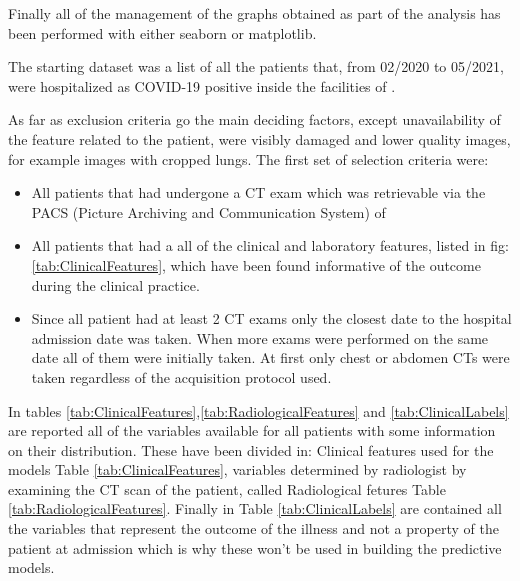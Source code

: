 Finally all of the management of the graphs obtained as part of the analysis has been performed with either seaborn\cite{seaborn} or matplotlib\cite{matplotlib}.


The starting dataset was a list of all the patients that, from 02/2020 to 05/2021, were hospitalized as COVID-19 positive inside the facilities of \orsola. 

As far as exclusion criteria go the main deciding factors, except unavailability of the feature related to the patient, were visibly damaged and lower quality images, for example images with cropped lungs. The first set of selection criteria were:

\begin{itemize}
\item All patients that had undergone a CT exam which was retrievable via the PACS (Picture Archiving and Communication System) of \orsola
\item All patients that had a all of the clinical and laboratory features, listed in fig:\ref{tab:ClinicalFeatures}, which have been found informative of the outcome during the clinical practice.
\item Since all patient had at least 2 CT exams only the closest date to the hospital admission date was taken. When more exams were performed on the same date all of them were initially taken. At first only chest or abdomen CTs were taken regardless of the acquisition protocol used.
\end{itemize}

In tables \ref{tab:ClinicalFeatures},\ref{tab:RadiologicalFeatures} and  \ref{tab:ClinicalLabels} are reported all of the variables available for all patients with some information on their distribution.
These have been divided in: Clinical features used for the models Table \ref{tab:ClinicalFeatures}, variables determined by radiologist by examining the CT scan of the patient, called Radiological fetures Table \ref{tab:RadiologicalFeatures}.
Finally in Table \ref{tab:ClinicalLabels} are contained all the variables that represent the outcome of the illness and not a property of the patient at admission which is why these won't be used in building the predictive models.

